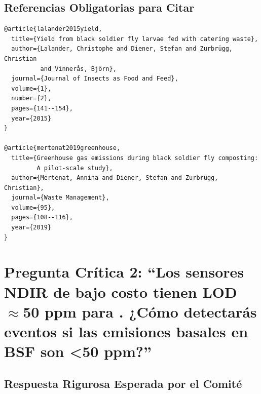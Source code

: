 \documentclass[12pt,oneside]{book}
\begin{document}
\subsection{Referencias Obligatorias para Citar}

\begin{verbatim}
@article{lalander2015yield,
  title={Yield from black soldier fly larvae fed with catering waste},
  author={Lalander, Christophe and Diener, Stefan and Zurbrügg, Christian 
          and Vinnerås, Björn},
  journal={Journal of Insects as Food and Feed},
  volume={1},
  number={2},
  pages={141--154},
  year={2015}
}

@article{mertenat2019greenhouse,
  title={Greenhouse gas emissions during black soldier fly composting: 
         A pilot-scale study},
  author={Mertenat, Annina and Diener, Stefan and Zurbrügg, Christian},
  journal={Waste Management},
  volume={95},
  pages={108--116},
  year={2019}
}
\end{verbatim}

\section{Pregunta Crítica 2: ``Los sensores NDIR de bajo costo tienen LOD $\approx$50 ppm para . ¿Cómo detectarás eventos si las emisiones basales en BSF son <50 ppm?''}

\subsection{Respuesta Rigurosa Esperada por el Comité}
\end{document}
